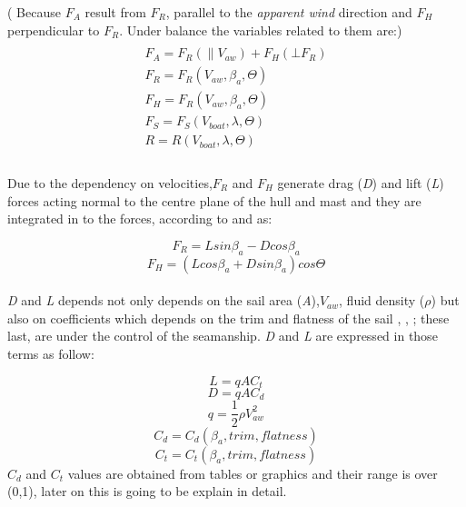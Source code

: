 ( Because $F_{A}$ result from $F_{R}$, parallel to the \textit{apparent wind} direction and $F_{H}$ perpendicular to $F_{R}$. Under balance the variables related to them are:)
\begin{multline}
\\
F_{A}=F_{R}(\parallel V_{aw}) + F_{H}(\bot F_{R} )\\
F_{R}=F_{R}(V_{aw},\beta_{a}, \Theta) \\
F_{H}=F_{R}(V_{aw},\beta_{a}, \Theta) \\
F_{S}=F_{S}(V_{boat},\lambda, \Theta) \\
R=R(V_{boat},\lambda, \Theta)\\  
\end{multline}
\\
Due to the dependency on velocities,$F_{R}$ and $F_{H}$ generate drag (\textit{D}) and lift (\textit{L}) forces acting normal to the centre plane of the hull and mast and they are integrated in to the forces, according to \cite{philpott1993yacht} and \cite{claughton1998sailing} as: \par 
\begin{equation} \label{eq:Fr_LD}
    F_{R}=L sin \beta_{a} - D cos \beta_{a}
\end{equation}
\begin{equation} \label{eq:Fh_LD}
    F_{H}=(L cos \beta_{a} + D sin \beta_{a}) cos\Theta
\end{equation}
\\ \textit{D} and \textit{L} depends not only depends on  the sail area (\textit{A}),$V_{aw}$, fluid density ($\rho$) but also on coefficients which depends on the trim and flatness of the sail \cite{philpott1993yacht}, \cite{carrico17symp}, \cite{day2017performance}; these last, are under the control of the seamanship. \textit{D} and \textit{L}  are expressed in those terms as follow: \par
\begin{equation} \label{eq:Lift}
  L=qAC_{t}  
\end{equation}
\begin{equation} \label{eq:Draf}
    D=qAC_{d}  
\end{equation}
\begin{equation} \label{eq:dynamic_press}
    q=\frac{1}{2}\rho V_{aw}^2
\end{equation}
\begin{equation} \label{eq:Cd}
    C_{d}=C_{d}(\beta_{a},trim, flatness)
\end{equation}
\begin{equation} \label{eq:Ct}
    C_{t}=C_{t}(\beta_{a},trim, flatness)
\end{equation}
$C_{d}$ and $C_{t}$ values are obtained from tables or graphics and their range is over (0,1), later on this is going to be explain in detail. \par 

